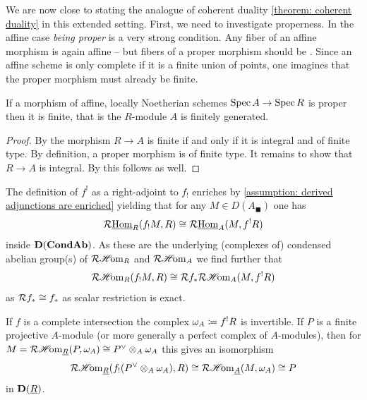 We are now close to stating the analogue of coherent duality \ref{theorem: coherent duality} in this extended setting. First, we need to investigate properness. In the affine case \emph{being proper} is a very strong condition. Any fiber of an affine morphism is again affine -- but fibers of a proper morphism should be . Since an affine scheme is only complete if it is a finite union of points, one imagines that the proper morphism must already be finite.
\begin{lemma}
	If a morphism of affine, locally Noetherian schemes $\operatorname{Spec} A\to \operatorname{Spec} R$ is proper then it is finite, that is the $R$-module $A$ is finitely generated.
\end{lemma}
\begin{proof}
	By \cite[\href{https://stacks.math.columbia.edu/tag/02JJ}{Tag 02JJ}]{stacks-project} the morphism $R\to A$ is finite if and only if it is integral and of finite type. By definition, a proper morphism is of finite type. It remains to show that $R\to A$ is integral. By \cite[\href{https://mathoverflow.net/a/125793/546808}{this MathOverflow answer}]{proper-affine-integral} this follows as well.
\end{proof}


\begin{remark}
	The definition of $f^!$ as a right-adjoint to $f_!$ enriches by \assumptionPreWord \ref{assumption: derived adjunctions are enriched} yielding that for any $M\in D(A_\blacksquare)$ one has
		$$\mathcal{R}{\underline{\operatorname{Hom}}}_R(f_!M,R)\cong \mathcal{R}{\underline{\operatorname{Hom}}}_A(M, f^!R)$$
	inside ${{\mathbf{D}}({{{\mathbf{Cond}}}{{\mathbf{Ab}}}})}$. As these are the underlying (complexes of) condensed abelian group(s) of $\mathcal{R}{\operatorname{\mathscr{H}\!om}}_R$ and $\mathcal{R}{\operatorname{\mathscr{H}\!om}}_A$ we find further that
		$$\mathcal{R}{\operatorname{\mathscr{H}\!om}}_R(f_!M, R)\cong \mathcal{R} f_\ast\mathcal{R}{\operatorname{\mathscr{H}\!om}}_A(M, f^!R)$$
	as $\mathcal{R} f_\ast \cong f_\ast$ as scalar restriction is exact.
	
	If $f$ is a complete intersection the complex $\omega_A\coloneqq f^!R$ is invertible. If $P$ is a finite projective $A$-module (or more generally a perfect complex of $A$-modules), then for $M=\mathcal{R}{\operatorname{\mathscr{H}\!om}}_{\underline{R}}(P, \omega_A)\cong P^\vee\otimes_A \omega_A$ this gives an isomorphism
	$$\mathcal{R}{\operatorname{\mathscr{H}\!om}}_{\underline{R}}(f_!(P^\vee\otimes_A \omega_A), R)\cong \mathcal{R}{\operatorname{\mathscr{H}\!om}}_{\underline{A}}(M, \omega_A) \cong P$$
	in ${{\mathbf{D}}({\underline{R}})}$.
\end{remark}

